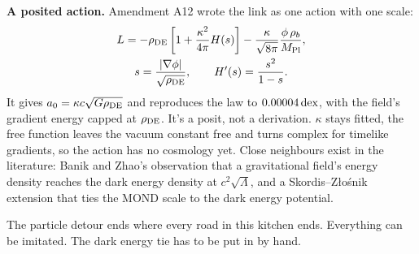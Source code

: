 


\textbf{A posited action.} Amendment A12 wrote the link as one action with one scale:
\begin{gather}
L=-\rho_{\rm DE}\left[1+\frac{\kappa^2}{4\pi}H(s)\right]-\frac{\kappa}{\sqrt{8\pi}}\frac{\phi\,\rho_b}{M_{\rm Pl}},\\
s=\frac{|\nabla\phi|}{\sqrt{\rho_{\rm DE}}},\qquad H'(s)=\frac{s^2}{1-s}.
\end{gather}
It gives $a_0=\kappa c\sqrt{G\rho_{\rm DE}}$ and reproduces the law to $0.00004\,\mathrm{dex}$, with the field's gradient energy capped at $\rho_{\rm DE}$. It's a posit, not a derivation. $\kappa$ stays fitted, the free function leaves the vacuum constant free and turns complex for timelike gradients, so the action has no cosmology yet. Close neighbours exist in the literature: Banik and Zhao's observation that a gravitational field's energy density reaches the dark energy density at $c^2\sqrt\Lambda$, and a Skordis--Z\l{}o\'snik extension that ties the MOND scale to the dark energy potential.

The particle detour ends where every road in this kitchen ends. Everything can be imitated. The dark energy tie has to be put in by hand.
